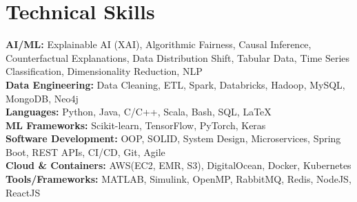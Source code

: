 \documentclass[letterpaper,11pt]{article}
\begin{document}
\section{Technical Skills}
 \begin{itemize}[leftmargin=0.15in, label={}]
    \small{\item{
     \textbf{AI/ML:}{ Explainable AI (XAI), Algorithmic Fairness, Causal Inference, Counterfactual Explanations, Data Distribution Shift, Tabular Data, Time Series Classification, Dimensionality Reduction, NLP} \\
     \textbf{Data Engineering:}{ Data Cleaning, ETL, Spark, Databricks, Hadoop, MySQL, MongoDB, Neo4j} \\
     \textbf{Languages:}{ Python, Java, C/C++, Scala, Bash, SQL, LaTeX} \\
     \textbf{ML Frameworks:}{ Scikit-learn, TensorFlow, PyTorch, Keras} \\
     \textbf{Software Development:}{ OOP, SOLID, System Design, Microservices, Spring Boot, REST APIs, CI/CD, Git, Agile} \\
     \textbf{Cloud \& Containers:}{ AWS(EC2, EMR, S3), DigitalOcean, Docker, Kubernetes} \\
     \textbf{Tools/Frameworks:}{ MATLAB, Simulink, OpenMP, RabbitMQ, Redis, NodeJS, ReactJS} \\
    }}

 \end{itemize}
 \vspace{-16pt}


\end{document}
